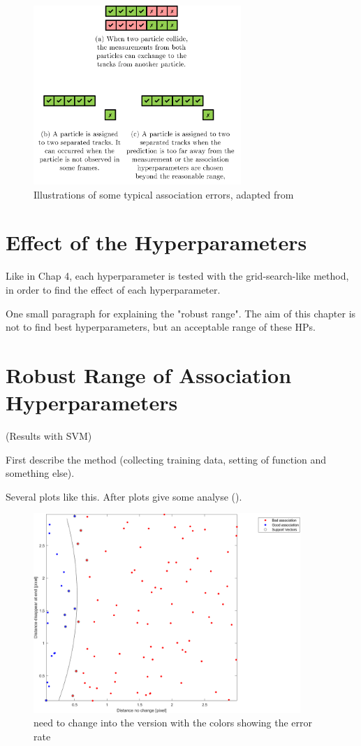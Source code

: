 \begin{figure}[htbp]
\centering
\includegraphics[width=0.7\textwidth]{figures/Asso/association error2.png}
\caption{Illustrations of some typical association errors, adapted from \cite{pfaff2019multitarget}}
\label{asso err2}
\end{figure}


\section{Effect of the Hyperparameters}

Like in Chap 4, each hyperparameter is tested with the grid-search-like method, in order to find the effect of each hyperparameter.

One small paragraph for explaining the "robust range". The aim of this chapter is not to find best hyperparameters, but an acceptable range of these HPs.


\section{Robust Range of Association Hyperparameters}

(Results with SVM)

First describe the method (collecting training data, setting of function and something else).

Several plots like this. After plots give some analyse (). 

\begin{figure}[htbp]
\centering
\includegraphics[width=0.9\textwidth]{figures/Asso/sample SVM.png}
\caption{need to change into the version with the colors showing the error rate}
\label{svm1}
\end{figure}